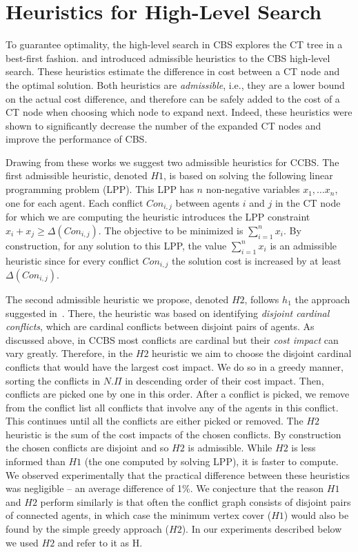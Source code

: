 \documentclass[letterpaper]{article} %
\newcommand{\cbs}{\ac{CBS}\xspace}
\newcommand{\ccbs}{\ac{CCBS}\xspace}
\newcommand{\ct}{\ac{CT}\xspace}
\begin{document}
\section{Heuristics for High-Level Search}


To guarantee optimality, the high-level search in \cbs explores the \ct tree in a best-first fashion. \citet{felner2018adding} and \citet{CBSH2} introduced admissible heuristics to the \cbs high-level search. 
These heuristics estimate the difference in cost between a CT node and the optimal solution. Both heuristics are \emph{admissible}, i.e., they are a lower bound on the actual cost difference, and therefore can be safely added to the cost of a \ct node when choosing which node to expand next. 
Indeed, these heuristics were shown to significantly decrease the number of the expanded \ct nodes and improve the performance of \cbs. 


Drawing from these works we suggest two admissible heuristics for \ccbs. 
The first admissible heuristic, denoted $H1$, is based on solving the following linear programming problem (LPP). 
This LPP has $n$ non-negative variables $x_1,\ldots x_n$, one for each agent. 
Each conflict $Con_{i,j}$ between agents $i$ and $j$ 
in the \ct node for which we are computing the heuristic
introduces the LPP constraint $x_i + x_j \geq \Delta(Con_{i,j})$. 
The objective to be minimized is $\sum_{i=1}^n{x_i}$. 
By construction, for any solution to this LPP, the value $\sum_{i=1}^n{x_i}$ is an admissible heuristic since for every conflict $Con_{i,j}$ the solution cost is increased by at least $\Delta(Con_{i,j})$. 


The second admissible heuristic we propose, denoted $H2$, follows $h_1$ the approach suggested in~\cite{felner2018adding}. 
There, the heuristic was based on identifying \emph{disjoint cardinal conflicts}, which are cardinal conflicts between disjoint pairs of agents. 
As discussed above, in \ccbs most conflicts are cardinal but their \emph{cost impact} can vary greatly. 
Therefore, in the $H2$ heuristic we aim to choose the disjoint cardinal conflicts that would have the largest cost impact. We do so in a greedy manner, sorting the conflicts in $N.\Pi$ in descending order of their cost impact. Then, conflicts are picked one by one in this order. 
After a conflict is picked, we remove from the conflict list all conflicts that involve any of the agents in this conflict. This continues until all the conflicts are either picked or removed. 
The $H2$ heuristic is the sum of the cost impacts of the chosen conflicts. 
By construction the chosen conflicts are disjoint and so $H2$ is admissible. 
While $H2$ is less informed than $H1$ (the one computed by solving LPP), it is faster to compute. 
We observed experimentally that the practical difference between these heuristics was negligible -- an average difference of 1\%. We conjecture that the reason $H1$ and $H2$ perform similarly is that often the conflict graph consists of disjoint pairs of connected agents, in which case the minimum vertex cover ($H1$) would also be found by the simple greedy approach ($H2$).
In our experiments described below we used $H2$ and refer to it as H. 
\end{document}
